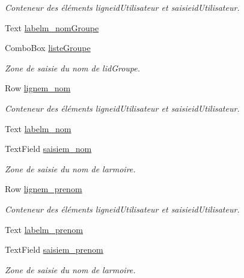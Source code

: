 \begin{DoxyCompactItemize}
\begin{DoxyCompactList}\small\item\em Conteneur des éléments ligneid\+Utilisateur et saisieid\+Utilisateur. \end{DoxyCompactList}\item 
Text \hyperlink{class_ajout_utilisateur_a3ce9969dbcf95400aa47dfa2e8deada9}{labelm\+\_\+nom\+Groupe}
\item 
Combo\+Box \hyperlink{class_ajout_utilisateur_a897369e0459ed7d187511d7f3f2c2b12}{liste\+Groupe}
\begin{DoxyCompactList}\small\item\em Zone de saisie du nom de l\textquotesingle{}id\+Groupe. \end{DoxyCompactList}\item 
Row \hyperlink{class_ajout_utilisateur_a9be896e78490366722ff73c3cd1968d9}{lignem\+\_\+nom}
\begin{DoxyCompactList}\small\item\em Conteneur des éléments ligneid\+Utilisateur et saisieid\+Utilisateur. \end{DoxyCompactList}\item 
Text \hyperlink{class_ajout_utilisateur_acc4650cd5de29225054a19161243cda0}{labelm\+\_\+nom}
\item 
Text\+Field \hyperlink{class_ajout_utilisateur_a73b65f10c7782dff8a15a889181658fc}{saisiem\+\_\+nom}
\begin{DoxyCompactList}\small\item\em Zone de saisie du nom de l\textquotesingle{}armoire. \end{DoxyCompactList}\item 
Row \hyperlink{class_ajout_utilisateur_ad2dbd1d366a1febfd716b5de28ea23a8}{lignem\+\_\+prenom}
\begin{DoxyCompactList}\small\item\em Conteneur des éléments ligneid\+Utilisateur et saisieid\+Utilisateur. \end{DoxyCompactList}\item 
Text \hyperlink{class_ajout_utilisateur_a54d3c63863ac1c3982a797d28eb6f20b}{labelm\+\_\+prenom}
\item 
Text\+Field \hyperlink{class_ajout_utilisateur_ae718112b2d91a554fa3fba8dc37a413f}{saisiem\+\_\+prenom}
\begin{DoxyCompactList}\small\item\em Zone de saisie du nom de l\textquotesingle{}armoire. \end{DoxyCompactList}\item 

\end{DoxyCompactItemize}
